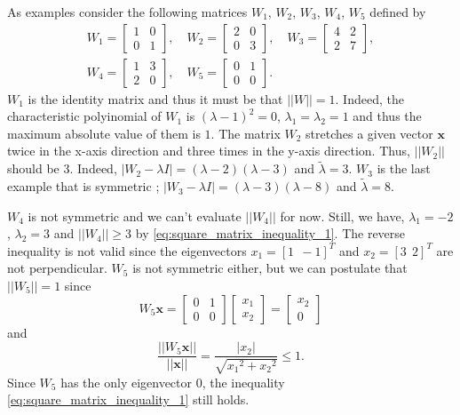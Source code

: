 \documentclass[12pt]{report}
\numberwithin{figure}{chapter}
\theoremstyle{plain}
\theoremstyle{definition}
\theoremstyle{corollary}
\theoremstyle{definition}
\theoremstyle{plain}
\theoremstyle{definition}
\theoremstyle{plain}
\newcommand\bx{\ensuremath{\boldsymbol x}}
\begin{document}
As examples consider the following matrices \(W_1\), \(W_2\), \(W_3\), \(W_4\), \(W_5\) defined by
\begin{gather*}
W_1=\begin{bmatrix}
1&0\\0&1
\end{bmatrix},\quad
W_2=\begin{bmatrix}
2&0\\0&3
\end{bmatrix},\quad
W_3=\begin{bmatrix}
4&2\\2&7
\end{bmatrix},\\
W_4=\begin{bmatrix}
1&3\\2&0
\end{bmatrix},\quad
W_5=\begin{bmatrix}
0&1\\0&0
\end{bmatrix}.\quad
\end{gather*}
\(W_1\) is the identity matrix and thus it must be that \(||W||=1\).
Indeed, the characteristic polyinomial of \(W_1\) is \((\lambda-1)^2=0\), \(\lambda_1=\lambda_2=1\) and thus the maximum absolute value of them is \(1\).
The matrix \(W_2\) stretches a given vector \(\bx\) twice in the x-axis direction and three times in the y-axis direction.
Thus, \(||W_2||\) should be \(3\).
Indeed, \(|W_2-\lambda I|=(\lambda-2)(\lambda-3)\) and \(\tilde\lambda=3\).
\(W_3\) is the last example that is symmetric ; \(|W_3-\lambda I|=(\lambda-3)(\lambda-8)\) and \(\tilde\lambda=8\).

\(W_4\) is not symmetric and we can't evaluate \(||W_4||\) for now.
Still, we have, \(\lambda_1=-2\), \(\lambda_2=3\) and \(||W_4||\ge3\) by \eqref{eq:square_matrix_inequality_1}.
The reverse inequality is not valid since the eigenvectors \(x_1=[1\:\:-1]^T\) and \(x_2=[3\:\:2]^T\) are not perpendicular.
\(W_5\) is not symmetric either, but we can postulate that \(||W_5||=1\) since
\[
W_5\bx=
\begin{bmatrix}
0&1\\0&0
\end{bmatrix}
\begin{bmatrix}
x_1\\x_2
\end{bmatrix}
=
\begin{bmatrix}
x_2\\0
\end{bmatrix}
\]
and
\[
\frac{||W_5\bx||}{||\bx||}=\frac{|x_2|}{\sqrt{{x_1}^2+{x_2}^2}}\le 1.
\]
Since \(W_5\) has the only eigenvector \(0\), the inequality \eqref{eq:square_matrix_inequality_1} still holds.
\end{document}
